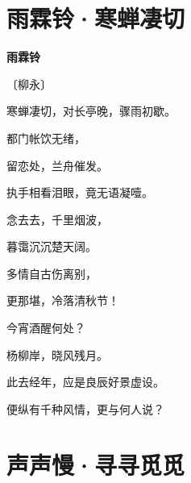 \documentclass[12pt,UTF-8,openany,fontset=none]{ctexbook}
\begin{document}
\vspace{8pt}
\clearpage

\section{雨霖铃·寒蝉凄切}


\begin{center}
    {\bfseries 雨霖铃}

    \vspace{18pt}

    \begin{large}\xuwen
        〔柳永〕
    \end{large}

\end{center}

    \vspace{18pt}  %

\begin{center}
    \begin{Large}

        寒蝉凄切，对长亭晚，骤雨初歇。
        
        都门帐饮无绪，
        
        留恋处，兰舟催发。
        
        执手相看泪眼，竟无语凝噎。
        
        念去去，千里烟波，
        
        暮霭沉沉楚天阔。

        \vspace{18pt}  %

        多情自古伤离别，
        
        更那堪，冷落清秋节！
        
        今宵酒醒何处？
        
        杨柳岸，晓风残月。
        
        此去经年，应是良辰好景虚设。
        
        便纵有千种风情，更与何人说？

    \end{Large}

\end{center}

\vspace{8pt}
\clearpage

\section{声声慢·寻寻觅觅}
\end{document}
